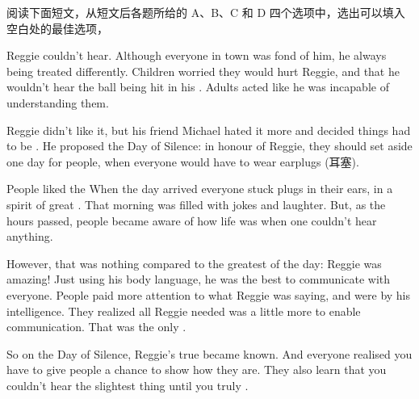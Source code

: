 \documentclass{英语试卷}
\begin{document}
\par 阅读下面短文，从短文后各题所给的 A、B、C 和 D 四个选项中，选出可以填入空白处的最佳选项，\par
\par Reggie couldn't hear. Although everyone in town was fond of him, he always  being treated differently. Children worried they would hurt Reggie, and that he wouldn't hear the ball being hit in his . Adults acted like he was incapable of understanding them.\par
\par Reggie didn't like it, but his friend Michael hated it more and decided things had to be . He proposed the Day of Silence: in honour of Reggie, they should set aside one day for  people, when everyone would have to wear earplugs (耳塞).\par
\par People liked the  When the day arrived everyone stuck plugs in their ears, in a spirit of great . That morning was filled with jokes and laughter. But, as the hours passed, people became aware of how  life was when one couldn't hear anything.\par
\par However, that was nothing compared to the greatest  of the day: Reggie was amazing! Just using his  body language, he was the best to communicate with everyone. People paid more attention to what Reggie was saying, and were  by his intelligence. They realized all Reggie needed was a little more  to enable communication. That was the only .\par
\par So on the Day of Silence, Reggie's true  became known. And everyone realised you have to give people a chance to show how  they are. They also learn that you couldn't hear the slightest thing until you truly .\par
{}
\end{document}
